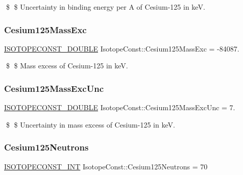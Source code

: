 \$ \$ Uncertainty in binding energy per A of Cesium-\/125 in keV. \mbox{\label{group___isotope_const-_cesium-_cs125_ga2b10064c0228be6287049bd788f81c5d}} 
\subsubsection{\texorpdfstring{Cesium125\+Mass\+Exc}{Cesium125MassExc}}
{\footnotesize\ttfamily \mbox{\hyperlink{group___isotope_const-_macros_ga8f45a7272ce02c0b4c65c44636ed719a}{I\+S\+O\+T\+O\+P\+E\+C\+O\+N\+S\+T\+\_\+\+D\+O\+U\+B\+LE}} Isotope\+Const\+::\+Cesium125\+Mass\+Exc = -\/84087.}

\$ \$ Mass excess of Cesium-\/125 in keV. \mbox{\label{group___isotope_const-_cesium-_cs125_gae72059c860f49e21b211562746cffbd2}} 
\subsubsection{\texorpdfstring{Cesium125\+Mass\+Exc\+Unc}{Cesium125MassExcUnc}}
{\footnotesize\ttfamily \mbox{\hyperlink{group___isotope_const-_macros_ga8f45a7272ce02c0b4c65c44636ed719a}{I\+S\+O\+T\+O\+P\+E\+C\+O\+N\+S\+T\+\_\+\+D\+O\+U\+B\+LE}} Isotope\+Const\+::\+Cesium125\+Mass\+Exc\+Unc = 7.}

\$ \$ Uncertainty in mass excess of Cesium-\/125 in keV. \mbox{\label{group___isotope_const-_cesium-_cs125_ga060297a63119ef280fbb082c0d1f6ac6}} 
\subsubsection{\texorpdfstring{Cesium125\+Neutrons}{Cesium125Neutrons}}
{\footnotesize\ttfamily \mbox{\hyperlink{group___isotope_const-_macros_ga5f18360b3e99483a35c32d789e62621c}{I\+S\+O\+T\+O\+P\+E\+C\+O\+N\+S\+T\+\_\+\+I\+NT}} Isotope\+Const\+::\+Cesium125\+Neutrons = 70}

